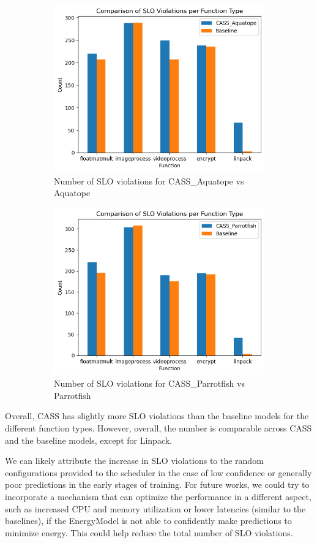 \documentclass[times, 10pt,twocolumn]{article}
\begin{document}
\begin{figure}[H] %
   \centering
   \begin{subfigure}[b]{0.5\textwidth} %
         \centering
         \includegraphics[width=0.6\linewidth]{imgs/final_experiment_plots/duration_comparison/aquatope.png}
         \caption{Number of SLO violations for CASS\_Aquatope vs Aquatope}
         \label{fig:cassvsaquatope_slo}
   \end{subfigure}
   \begin{subfigure}[b]{0.5\textwidth} %
         \centering
         \includegraphics[width=0.6\linewidth]{imgs/final_experiment_plots/duration_comparison/parrotfish.png}
         \caption{Number of SLO violations for CASS\_Parrotfish vs Parrotfish}
         \label{fig:cassvsparrotfish_slo}
   \end{subfigure}
   \caption{}
\end{figure}

Overall, CASS has slightly more SLO violations than the baseline models for the different function types. However, overall, the number is comparable across CASS and the baseline models, except for Linpack. 

We can likely attribute the increase in SLO violations to the random configurations provided to the scheduler in the case of low confidence or generally poor predictions in the early stages of training. For future works, we could try to incorporate a mechanism that can optimize the performance in a different aspect, such as increased CPU and memory utilization or lower latencies (similar to the baselines), if the EnergyModel is not able to confidently make predictions to minimize energy. This could help reduce the total number of SLO violations. 
\end{document}
